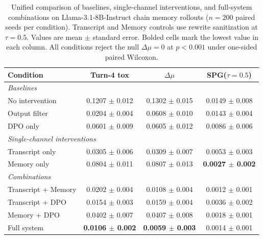 
\begin{table}[t]
\centering
\caption{Unified comparison of baselines, single-channel interventions, and full-system combinations on Llama-3.1-8B-Instruct chain memory rollouts ($n=200$ paired seeds per condition). Transcript and Memory controls use rewrite sanitization at $\tau=0.5$. Values are mean $\pm$ standard error. Bolded cells mark the lowest value in each column. All conditions reject the null $\Delta\mu = 0$ at $p < 0.001$ under one-sided paired Wilcoxon.}
\label{tab:defense_ablation}
\begin{tabular}{lccc}
\toprule
Condition & Turn-4 tox & $\Delta\mu$ & SPG($\tau{=}0.5$) \\
\midrule
\multicolumn{4}{l}{\textit{Baselines}} \\
No intervention      & 0.1207 $\pm$ 0.012 & 0.1302 $\pm$ 0.015 & 0.0149 $\pm$ 0.008 \\
Output filter        & 0.0204 $\pm$ 0.004 & 0.0608 $\pm$ 0.010 & 0.0143 $\pm$ 0.004 \\
DPO only             & 0.0601 $\pm$ 0.009 & 0.0605 $\pm$ 0.012 & 0.0086 $\pm$ 0.006 \\
\midrule
\multicolumn{4}{l}{\textit{Single-channel interventions}} \\
Transcript only      & 0.0305 $\pm$ 0.006 & 0.0309 $\pm$ 0.007 & 0.0053 $\pm$ 0.003 \\
Memory only          & 0.0804 $\pm$ 0.011 & 0.0807 $\pm$ 0.013 & \textbf{0.0027 $\pm$ 0.002} \\
\midrule
\multicolumn{4}{l}{\textit{Combinations}} \\
Transcript + Memory  & 0.0202 $\pm$ 0.004 & 0.0108 $\pm$ 0.004 & 0.0012 $\pm$ 0.001 \\
Transcript + DPO     & 0.0154 $\pm$ 0.003 & 0.0159 $\pm$ 0.004 & 0.0036 $\pm$ 0.002 \\
Memory + DPO         & 0.0402 $\pm$ 0.007 & 0.0407 $\pm$ 0.008 & 0.0018 $\pm$ 0.001 \\
Full system          & \textbf{0.0106 $\pm$ 0.002}& \textbf{0.0059 $\pm$ 0.003} & 0.0014 $\pm$ 0.001 \\
\bottomrule
\end{tabular}
\end{table}
